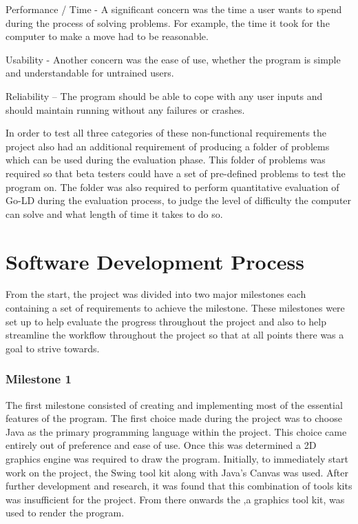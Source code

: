 \documentclass{l4proj}
\begin{document}
Performance / Time - A significant concern was the time a user wants to spend during the process of solving problems. For example, the time it took for the computer to make a move had to be reasonable.

Usability - Another concern was the ease of use, whether the program is simple and understandable for untrained users.

Reliability – The program should be able to cope with any user inputs and should maintain running without any failures or crashes.

In order to test all three categories of these non-functional requirements the project also had an additional requirement of producing a folder of problems which can be used during the evaluation phase. This folder of problems was required so that beta testers could have a set of pre-defined problems to test the program on. The folder was also required to perform quantitative evaluation of Go-LD during the evaluation process, to judge the level of difficulty the computer can solve and what length of time it takes to do so.

\section{Software Development Process}
From the start, the project was divided into two major milestones each containing a set of requirements to achieve the milestone. These milestones were set up to help evaluate the progress throughout the project and also to help streamline the workflow throughout the project so that at all points there was a goal to strive towards.

\subsubsection{Milestone 1}
The first milestone consisted of creating and implementing most of the essential features of the program. The first choice made during the project was to choose Java as the primary programming language within the project. This choice came entirely out of preference and ease of use. Once this was determined a 2D graphics engine was required to draw the program. Initially, to immediately start work on the project, the Swing tool kit along with Java’s Canvas was used. After further development and research, it was found that this combination of tools kits was insufficient for the project. From there onwards the  \cite{SLICK2D} ,a graphics tool kit, was used to render the program.
\end{document}

